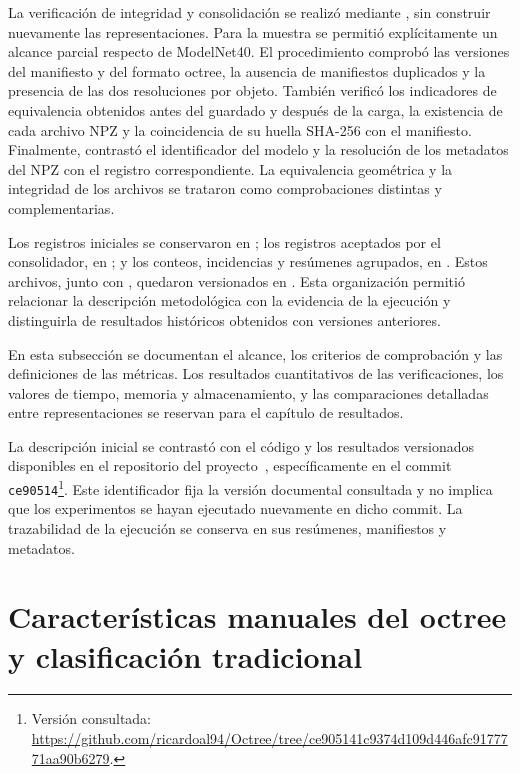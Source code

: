 La verificación de integridad y consolidación se realizó mediante \protect{}, sin construir nuevamente las representaciones. Para la muestra se permitió explícitamente un alcance parcial respecto de ModelNet40. El procedimiento comprobó las versiones del manifiesto y del formato octree, la ausencia de manifiestos duplicados y la presencia de las dos resoluciones por objeto. También verificó los indicadores de equivalencia obtenidos antes del guardado y después de la carga, la existencia de cada archivo NPZ y la coincidencia de su huella SHA-256 con el manifiesto. Finalmente, contrastó el identificador del modelo y la resolución de los metadatos del NPZ con el registro correspondiente. La equivalencia geométrica y la integridad de los archivos se trataron como comprobaciones distintas y complementarias.

Los registros iniciales se conservaron en \protect{}; los registros aceptados por el consolidador, en \protect{}; y los conteos, incidencias y resúmenes agrupados, en \protect{}. Estos archivos, junto con \protect{}, quedaron versionados en \protect{}. Esta organización permitió relacionar la descripción metodológica con la evidencia de la ejecución y distinguirla de resultados históricos obtenidos con versiones anteriores.

En esta subsección se documentan el alcance, los criterios de comprobación y las definiciones de las métricas. Los resultados cuantitativos de las verificaciones, los valores de tiempo, memoria y almacenamiento, y las comparaciones detalladas entre representaciones se reservan para el capítulo de resultados.

La descripción inicial se contrastó con el código y los resultados versionados disponibles en el repositorio del proyecto~\parencite{lopez2026octree}, específicamente en el commit \texttt{ce90514}\footnote{Versión consultada: \url{https://github.com/ricardoal94/Octree/tree/ce905141c9374d109d446afc9177771aa90b6279}.}. Este identificador fija la versión documental consultada y no implica que los experimentos se hayan ejecutado nuevamente en dicho commit. La trazabilidad de la ejecución se conserva en sus resúmenes, manifiestos y metadatos.


\section{Características manuales del octree y clasificación tradicional}
\label{sec:hce-clasificacion}

